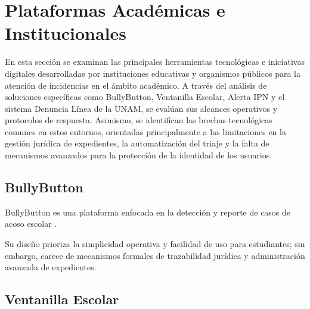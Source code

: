 
\section{Plataformas Académicas e Institucionales}

En esta sección se examinan las principales herramientas tecnológicas e iniciativas digitales desarrolladas por instituciones educativas y organismos públicos para la atención de incidencias en el ámbito académico. A través del análisis de soluciones específicas como BullyButton, Ventanilla Escolar, Alerta IPN y el sistema Denuncia Línea de la UNAM, se evalúan sus alcances operativos y protocolos de respuesta. Asimismo, se identifican las brechas tecnológicas comunes en estos entornos, orientadas principalmente a las limitaciones en la gestión jurídica de expedientes, la automatización del triaje y la falta de mecanismos avanzados para la protección de la identidad de los usuarios.


\subsection{BullyButton}

\begin{flushleft}
\justifying

BullyButton es una plataforma enfocada en la detección y reporte de casos de acoso escolar \cite{21}.

Su diseño prioriza la simplicidad operativa y facilidad de uso para estudiantes; sin embargo, carece de mecanismos formales de trazabilidad jurídica y administración avanzada de expedientes.

\end{flushleft}


\subsection{Ventanilla Escolar}

